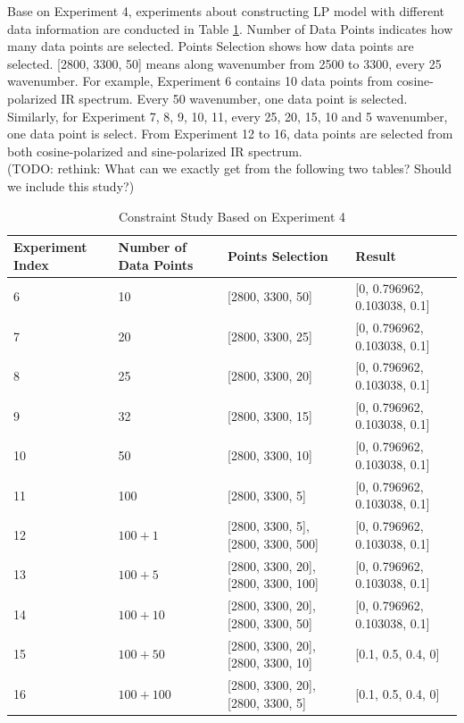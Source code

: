 Base on Experiment 4, experiments about constructing LP model with different data information are conducted in Table \ref{tab:3.4}. Number of Data Points indicates how many data points are selected. Points Selection shows how data points are selected. [2800, 3300, 50] means along wavenumber from 2500 to 3300, every 25 wavenumber. For example, Experiment 6 contains 10 data points from cosine-polarized IR spectrum. Every 50 wavenumber, one data point is selected. Similarly, for Experiment 7, 8, 9, 10, 11, every 25, 20, 15, 10 and 5 wavenumber, one data point is select. From Experiment 12 to 16, data points are selected from both cosine-polarized and sine-polarized IR spectrum. \\

(TODO: rethink: What can we exactly get from the following two tables? Should we include this study?)

\begin{table} \small \label{tab:3.4}
\begin{center}
\begin{tabular}{| l | l | p{3cm} | l |} \hline
	Experiment Index & Number of Data Points & Points Selection & Result \\ \hline
	6 & 10 & [2800, 3300, 50] & [0, 0.796962, 0.103038, 0.1] \\ \hline
	7 & 20 & [2800, 3300, 25] & [0, 0.796962, 0.103038, 0.1] \\ \hline
	8 & 25 & [2800, 3300, 20] & [0, 0.796962, 0.103038, 0.1] \\ \hline
	9 & 32 & [2800, 3300, 15] & [0, 0.796962, 0.103038, 0.1] \\ \hline
	10 & 50 & [2800, 3300, 10] & [0, 0.796962, 0.103038, 0.1] \\ \hline
	11 & 100 & [2800, 3300, 5] & [0, 0.796962, 0.103038, 0.1] \\ \hline
	12 & $100 + 1$ & [2800, 3300, 5], [2800, 3300, 500] & [0, 0.796962, 0.103038, 0.1] \\ \hline
	13 & $100 + 5$ & [2800, 3300, 20], [2800, 3300, 100] & [0, 0.796962, 0.103038, 0.1] \\ \hline
	14 & $100 + 10$ & [2800, 3300, 20], [2800, 3300, 50] & [0, 0.796962, 0.103038, 0.1] \\ \hline
	15 & $100 + 50$ & [2800, 3300, 20], [2800, 3300, 10] & [0.1, 0.5, 0.4, 0] \\ \hline
	16 & $100 + 100$ & [2800, 3300, 20], [2800, 3300, 5] & [0.1, 0.5, 0.4, 0] \\ 
	\hline
\end{tabular} 
\end{center}
\caption{Constraint Study Based on Experiment 4}
\end{table}

